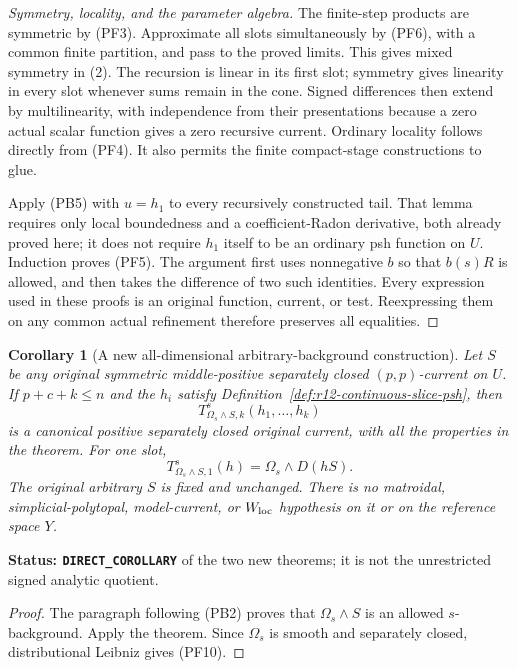 \documentclass[11pt,a4paper]{article}
\numberwithin{equation}{section}
\newtheorem{corollary}[theorem]{Corollary}
\theoremstyle{definition}
\theoremstyle{remark}
\begin{document}
\begin{proof}[Symmetry, locality, and the parameter algebra]
The finite-step products are symmetric by (PF3). Approximate all
slots simultaneously by (PF6), with a common finite partition,
and pass to the proved limits. This gives mixed symmetry in (2).
The recursion is linear in its first slot; symmetry gives linearity
in every slot whenever sums remain in the cone. Signed differences
then extend by multilinearity, with independence from their
presentations because a zero actual scalar function gives a zero
recursive current. Ordinary locality follows directly from (PF4).
It also permits the finite compact-stage constructions to glue.

Apply (PB5) with $u=h_1$ to every recursively constructed tail.
That lemma requires only local boundedness and a coefficient-Radon
derivative, both already proved here; it does not require $h_1$
itself to be an ordinary psh function on $U$. Induction proves
(PF5). The argument first uses nonnegative $b$ so that $b(s)R$
is allowed, and then takes the difference of two such identities.
Every expression used in these proofs is an original function,
current, or test. Reexpressing them on any common actual refinement
therefore preserves all equalities.
\end{proof}

\begin{corollary}[A new all-dimensional arbitrary-background construction]
\label{cor:r12-parametric-arbitrary-S}
Let $S$ be any original symmetric middle-positive separately closed
$(p,p)$-current on $U$. If $p+c+k\le n$ and the $h_i$ satisfy
Definition~\ref{def:r12-continuous-slice-psh}, then
\[
               T^s_{\Omega_s\wedge S,k}(h_1,\ldots,h_k)
 \tag{PF9}
\]
is a canonical positive separately closed original current, with
all the properties in the theorem. For one slot,
\[
                 T^s_{\Omega_s\wedge S,1}(h)
                                =\Omega_s\wedge D(hS).
 \tag{PF10}
\]
The original arbitrary $S$ is fixed and unchanged. There is no
matroidal, simplicial-polytopal, model-current, or $W_{\rm loc}$
hypothesis on it or on the reference space $Y$.
\end{corollary}

\noindent\textbf{Status: \texttt{DIRECT\_COROLLARY}} of the two
new theorems; it is not the unrestricted signed analytic quotient.

\begin{proof}
The paragraph following (PB2) proves that $\Omega_s\wedge S$ is
an allowed $s$-background. Apply the theorem. Since $\Omega_s$ is
smooth and separately closed, distributional Leibniz gives (PF10).
\end{proof}
\end{document}
